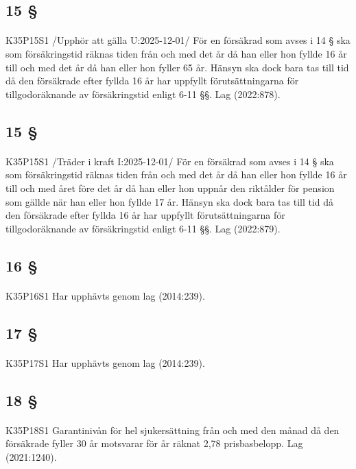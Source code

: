 \documentclass[a4paper,notitlepage,openany,10pt]{book}
\begin{document}
\subsection*{15 §}
\paragraph*{}
{\tiny K35P15S1}
/Upphör att gälla U:2025-12-01/
För en försäkrad som avses i 14 § ska som försäkringstid räknas tiden från och med det år då han eller hon fyllde 16 år till och med det år då han eller hon fyller 65 år. Hänsyn ska dock bara tas till tid då den försäkrade efter fyllda 16 år har uppfyllt förutsättningarna för tillgodoräknande av försäkringstid enligt 6-11 §§.
Lag (2022:878).
\subsection*{15 §}
\paragraph*{}
{\tiny K35P15S1}
/Träder i kraft I:2025-12-01/
För en försäkrad som avses i 14 § ska som försäkringstid räknas tiden från och med det år då han eller hon fyllde 16 år till och med året före det år då han eller hon uppnår den riktålder för pension som gällde när han eller hon fyllde 17 år. Hänsyn ska dock bara tas till tid då den försäkrade efter fyllda 16 år har uppfyllt förutsättningarna för tillgodoräknande av försäkringstid enligt 6-11 §§.
Lag (2022:879).
\subsection*{16 §}
\paragraph*{}
{\tiny K35P16S1}
Har upphävts genom
lag (2014:239).
\subsection*{17 §}
\paragraph*{}
{\tiny K35P17S1}
Har upphävts genom
lag (2014:239).
\subsection*{18 §}
\paragraph*{}
{\tiny K35P18S1}
Garantinivån för hel sjukersättning från och med den månad då den försäkrade fyller 30 år motsvarar för år räknat 2,78 prisbasbelopp.
Lag (2021:1240).
\end{document}
